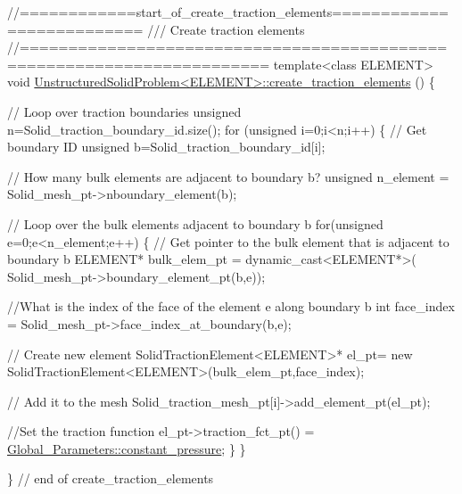 \begin{DoxyCodeInclude}



\textcolor{comment}{//============start\_of\_create\_traction\_elements==========================}\textcolor{comment}{}
\textcolor{comment}{/// Create traction elements }
\textcolor{comment}{}\textcolor{comment}{//=======================================================================}
\textcolor{keyword}{template}<\textcolor{keyword}{class} ELEMENT>
\textcolor{keywordtype}{void} \hyperlink{classUnstructuredSolidProblem_a9137960284200ed998989f785965f902}{UnstructuredSolidProblem<ELEMENT>::create\_traction\_elements}
      ()
\{

 \textcolor{comment}{// Loop over traction boundaries}
 \textcolor{keywordtype}{unsigned} n=Solid\_traction\_boundary\_id.size();
 \textcolor{keywordflow}{for} (\textcolor{keywordtype}{unsigned} i=0;i<n;i++)
  \{
   \textcolor{comment}{// Get boundary ID}
   \textcolor{keywordtype}{unsigned} b=Solid\_traction\_boundary\_id[i];
   
   \textcolor{comment}{// How many bulk elements are adjacent to boundary b?}
   \textcolor{keywordtype}{unsigned} n\_element = Solid\_mesh\_pt->nboundary\_element(b);
   
   \textcolor{comment}{// Loop over the bulk elements adjacent to boundary b}
   \textcolor{keywordflow}{for}(\textcolor{keywordtype}{unsigned} e=0;e<n\_element;e++)
    \{
     \textcolor{comment}{// Get pointer to the bulk element that is adjacent to boundary b}
     ELEMENT* bulk\_elem\_pt = \textcolor{keyword}{dynamic\_cast<}ELEMENT*\textcolor{keyword}{>}(
      Solid\_mesh\_pt->boundary\_element\_pt(b,e));
     
     \textcolor{comment}{//What is the index of the face of the element e along boundary b}
     \textcolor{keywordtype}{int} face\_index = Solid\_mesh\_pt->face\_index\_at\_boundary(b,e);
     
     \textcolor{comment}{// Create new element }
     SolidTractionElement<ELEMENT>* el\_pt=
      \textcolor{keyword}{new} SolidTractionElement<ELEMENT>(bulk\_elem\_pt,face\_index);
     
     \textcolor{comment}{// Add it to the mesh}
     Solid\_traction\_mesh\_pt[i]->add\_element\_pt(el\_pt);
     
     \textcolor{comment}{//Set the traction function}
     el\_pt->traction\_fct\_pt() = \hyperlink{namespaceGlobal__Parameters_a7dc25ca2abd48b7f1bffb2d6129f02bd}{Global\_Parameters::constant\_pressure};
    \}
  \}
 
\} \textcolor{comment}{// end of create\_traction\_elements}

\end{DoxyCodeInclude}




